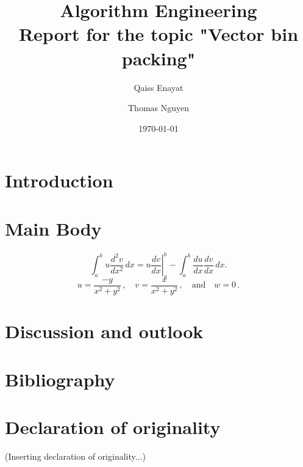 \documentclass[a4paper,11pt,titlepage]{article}
\begin{document}
\begin{titlepage}
    \title{Algorithm Engineering\\Report for the topic "Vector bin packing"}
    \author{Qaiss Enayat \and Thomas Nguyen}
    \date{\today}
\end{titlepage}
\maketitle
\tableofcontents
\pagebreak
\section{Introduction}
\lipsum[1-5]
\section{Main Body}
\lipsum[5-7]
\[
\int_a^bu\frac{d^2v}{dx^2}\,dx
=\left.u\frac{dv}{dx}\right|_a^b
-\int_a^b\frac{du}{dx}\frac{dv}{dx}\,dx.
\]
\lipsum[8]
\[
u=\frac{-y}{x^2+y^2}\,,\quad
v=\frac{x}{x^2+y^2}\,,\quad\text{and}\quad
w=0\,.
\]
\lipsum[1-3]
\section{Discussion and outlook}
\lipsum[1-4]
\section{Bibliography}
\lipsum[1-2]
\section{Declaration of originality}
(Inserting declaration of originality...)
\end{document}
